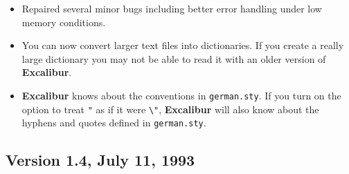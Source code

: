 ﻿\documentclass[11pt,titlepage]{article}
\newcommand{\ex}{\textbf{Excalibur}}
\begin{document}
\begin{itemize}

\item Repaired several minor bugs including better error handling
  under low memory conditions.

\item You can now convert larger text files into dictionaries.  If you
  create a really large dictionary you may not be able to read it with
  an older version of \ex{}.

\item \ex{} knows about the conventions in \texttt{german.sty}.  If
  you turn on the option to treat \texttt{"} as if it were \verb+\"+,
  \ex{} will also know about the hyphens and quotes defined in
  \texttt{german.sty}.

\end{itemize}

\subsection{Version 1.4, July 11, 1993}
\end{document}
